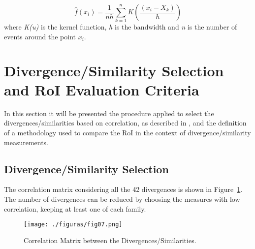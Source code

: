 \documentclass[conference]{IEEEtran}
\begin{document}
{\footnotesize
	\begin{equation}\label{eq:01}
	\hat f\left( {{x_i}} \right) = \frac{1}{{nh}}\mathop \sum \limits_{k = 1}^{n} K\left( {\frac{{({x_i} - {X_k})}}{h}} \right)
	\end{equation}
}where \emph{K(u)} is the kernel function, \emph{h} is the bandwidth and \textit{n} is the number of events around the point $x_i$.
 



\section{Divergence/Similarity Selection and RoI Evaluation Criteria}\label{desenvolvimento}

In this section it will be presented the procedure applied to select the divergences/similarities based on correlation, as described in \cite{cha2007comprehensive}, and the definition of a methodology used to compare the RoI in the context of divergence/similarity measurements.


%


\subsection{Divergence/Similarity Selection}

The correlation matrix considering all the 42 divergences is shown in Figure~\ref{fig:03}. The number of divergences can be reduced by choosing the measures with low correlation, keeping at least one of each family.

\begin{figure}[!h]
	\centering
	\texttt{[image: ./figuras/fig07.png]}
	\caption{Correlation Matrix between the Divergences/Similarities.}
	\label{fig:03}
\end{figure}
\end{document}
